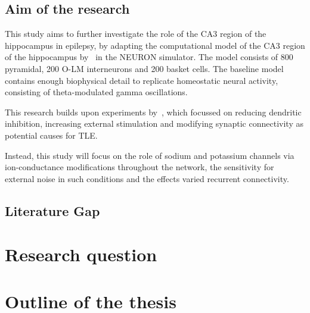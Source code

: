 \subsection{Aim of the research}
This study aims to further investigate the role of the CA3 region of the hippocampus in epilepsy, by adapting the computational model of the CA3 region of the hippocampus by~\textcite{neymotinKetamineDisruptsTheta2011} in the NEURON simulator.
The model consists of 800 pyramidal, 200 O-LM interneurons and 200 basket cells. 
The baseline model contains enough biophysical detail to replicate homeostatic neural activity, consisting of theta-modulated gamma oscillations.

This research builds upon experiments by~\textcite{sanjayImpairedDendriticInhibition2015}, which focussed on reducing dendritic inhibition, increasing external stimulation and modifying synaptic connectivity as potential causes for TLE\@.

Instead, this study will focus on the role of sodium and potassium channels via ion-conductance modifications throughout the network, the sensitivity for external noise in such conditions and the effects varied recurrent connectivity.

\subsection{Literature Gap}

\section{Research question}

\section{Outline of the thesis}